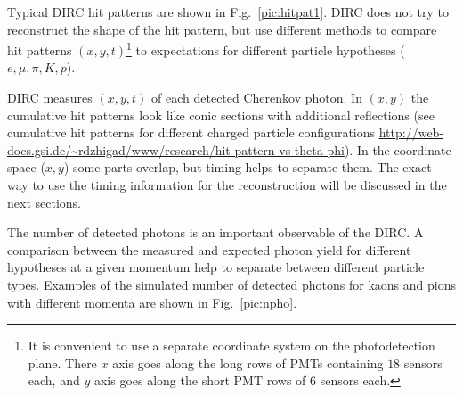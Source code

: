 Typical \gluex DIRC hit patterns are shown in Fig.~\ref{pic:hitpat1}. DIRC does not try to reconstruct the shape of the hit pattern, but use different methods to compare hit patterns $(x,y,t)$\footnote{It is convenient to use a separate coordinate system on the photodetection plane. There $x$ axis goes along the long rows of PMTs containing $18$ sensors each, and $y$ axis goes along the short PMT rows of $6$ sensors each.} to expectations for different particle hypotheses ($e, \mu, \pi, K, p$).


DIRC measures $(x,y,t)$ of each detected Cherenkov photon. In $(x,y)$ the cumulative hit patterns look like conic sections with additional reflections (see cumulative hit patterns for different charged particle configurations \url{http://web-docs.gsi.de/~rdzhigad/www/research/hit-pattern-vs-theta-phi}). In the coordinate space ($x ,y$) some parts overlap, but timing helps to separate them.
The exact way to use the timing information for the reconstruction will be discussed in the next sections.

The number of detected photons is an important observable of the DIRC. A comparison between the measured and expected photon yield for different hypotheses at a given momentum help to separate between different particle types. Examples of the simulated number of detected photons for kaons and pions with different momenta are shown in Fig.~\ref{pic:npho}.

